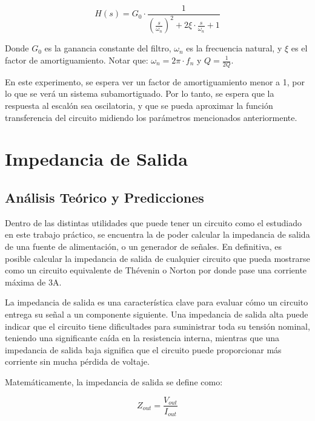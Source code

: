\documentclass[12pt,oneside,a4paper]{article}
\begin{document}
\begin{equation}
    H(s) = G_0 \cdot \frac{1}{(\frac{s}{\omega_n})^2 + 2\xi \cdot \frac{s}{\omega_n} + 1}
\end{equation}

Donde $G_0$ es la ganancia constante del filtro, $\omega_n$ es la frecuencia natural, y $\xi$ es el 
factor de amortiguamiento. Notar que: $\omega_n = 2\pi \cdot f_n$ y $Q = \frac{1}{2Q}$.

En este experimento, se espera ver un factor de amortiguamiento menor a 1, por lo que se verá un 
sistema subamortiguado. Por lo tanto, se espera que la respuesta al escalón sea oscilatoria, y que
se pueda aproximar la función transferencia del circuito midiendo los parámetros mencionados anteriormente.













\newpage

\section{Impedancia de Salida}
\subsection{Análisis Teórico y Predicciones}
Dentro de las distintas utilidades que puede tener un circuito como el estudiado en este trabajo práctico,
se encuentra la de poder calcular la impedancia de salida de una fuente de alimentación, o un generador de 
señales. En definitiva, es posible calcular la impedancia de salida de cualquier circuito que pueda mostrarse 
como un circuito equivalente de Thévenin o Norton por donde pase una corriente máxima de 3A. 

La impedancia de salida es una característica clave para evaluar cómo un circuito entrega su señal a un componente 
siguiente. Una impedancia de salida alta puede indicar que el circuito tiene dificultades para 
suministrar toda su tensión nominal, teniendo una significante caída en la resistencia interna, 
mientras que una impedancia de salida baja significa que el circuito puede proporcionar más corriente 
sin mucha pérdida de voltaje.

Matemáticamente, la impedancia de salida se define como:

\begin{equation}
    Z_{out} = \frac{V_{out}}{I_{out}}
\end{equation}
\end{document}
